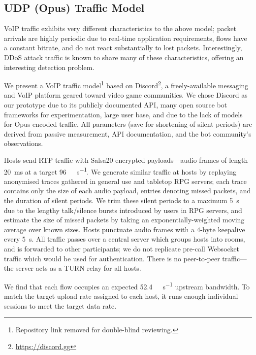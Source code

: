 \documentclass[10pt, times, conference, letterpaper]{IEEEtran}
\begin{document}
\subsection{UDP (Opus) Traffic Model}
VoIP traffic exhibits very different characteristics to the above model; packet arrivals are highly periodic due to real-time application requirements, flows have a constant bitrate, and do not react substantially to lost packets.
Interestingly, DDoS attack traffic is known to share many of these characteristics, offering an interesting detection problem.

We present a VoIP traffic model\footnote{Repository link removed for double-blind reviewing.} based on Discord\footnote{\url{https://discord.gg}}, a freely-available messaging and VoIP platform geared toward video game communities.
We chose Discord as our prototype due to its publicly documented API, many open source bot frameworks for experimentation, large user base, and due to the lack of models for Opus-encoded traffic.
All parameters (save for shortening of silent periods) are derived from passive measurement, API documentation, and the bot community's observations.

Hosts send RTP traffic with Salsa20 encrypted payloads---audio frames of length \SI{20}{\milli\second} at a target \SI{96}{\kilo\bit\per\second}.
We generate similar traffic at hosts by replaying anonymised traces gathered in general use and tabletop RPG servers; each trace contains only the size of each audio payload, entries denoting missed packets, and the duration of silent periods.
We trim these silent periods to a maximum \SI{5}{\second} due to the lengthy talk/silence bursts introduced by users in RPG servers, and estimate the size of missed packets by taking an exponentially-weighted moving average over known sizes.
Hosts punctuate audio frames with a 4-byte keepalive every \SI{5}{\second}.
All traffic passes over a central server which groups hosts into rooms, and is forwarded to other participants; we do not replicate pre-call Websocket traffic which would be used for authentication.
There is no peer-to-peer traffic---the server acts as a TURN relay \cite{rfc5766} for all hosts.

We find that each flow occupies an expected \SI{52.4}{\kilo\bit\per\second} upstream bandwidth.
To match the target upload rate assigned to each host, it runs enough individual sessions to meet the target data rate.
\end{document}
